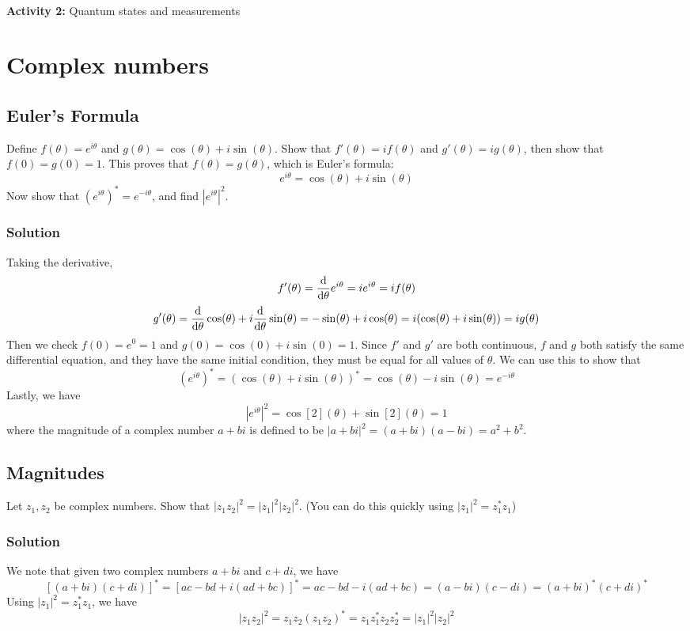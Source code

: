 \documentclass{article}
\begin{document}
\\
{\large \textbf{Activity 2:} Quantum states and measurements}\\

\section*{Complex numbers}
\subsection*{Euler's Formula}
Define $f(\theta) = e^{i\theta}$ and $g(\theta) = \cos(\theta) + i\sin(\theta)$. Show that $f'(\theta) = if(\theta)$ and $g'(\theta) = ig(\theta)$, then show that $f(0) = g(0) = 1$. This proves that $f(\theta) = g(\theta)$, which is Euler's formula:
$$
e^{i\theta} = \cos(\theta) + i\sin(\theta)
$$
Now show that $(e^{i\theta})^\ast = e^{-i\theta}$, and find $|e^{i\theta}|^2$.

\subsubsection*{Solution}
Taking the derivative,
$$
f'(\theta) = \dv{\theta}e^{i\theta} = ie^{i\theta} = if(\theta)
$$
$$
g'(\theta) = \dv{\theta}\cos(\theta) + i\dv{\theta}\sin(\theta) = -\sin(\theta) + i\cos(\theta) = i(\cos(\theta)+i\sin(\theta)) = ig(\theta)
$$
Then we check $f(0) = e^{0} = 1$ and $g(0) = \cos(0) + i\sin(0) = 1$. Since $f'$ and $g'$ are both continuous, $f$ and $g$ both satisfy the same differential equation, and they have the same initial condition, they must be equal for all values of $\theta$. We can use this to show that
$$
(e^{i\theta})^\ast = (\cos(\theta) + i\sin(\theta))^\ast = \cos(\theta) - i \sin(\theta) = e^{-i\theta}
$$
Lastly, we have
$$
|e^{i\theta}|^2 = \cos[2](\theta) + \sin[2](\theta) = 1
$$
where the magnitude of a complex number $a + bi$ is defined to be $|a+bi|^2 = (a+bi)(a-bi) = a^2 + b^2$.
\subsection*{Magnitudes}
Let $z_1, z_2$ be complex numbers. Show that $|z_1z_2|^2 = |z_1|^2|z_2|^2$. (You can do this quickly using $|z_1|^2 = z_1^\ast z_1$)

\subsubsection*{Solution}
We note that given two complex numbers $a + bi$ and $c+di$, we have
$$
[(a+bi)(c+di)]^\ast = [ac-bd+i(ad+bc)]^\ast = ac-bd-i(ad+bc) = (a-bi)(c-di) = (a+bi)^\ast(c+di)^\ast
$$
Using $|z_1|^2 = z_1^\ast z_1$, we have 
$$
|z_1z_2|^2 = z_1z_2(z_1z_2)^\ast = z_1z_1^\ast z_2 z_2^\ast = |z_1|^2|z_2|^2
$$
\end{document}
